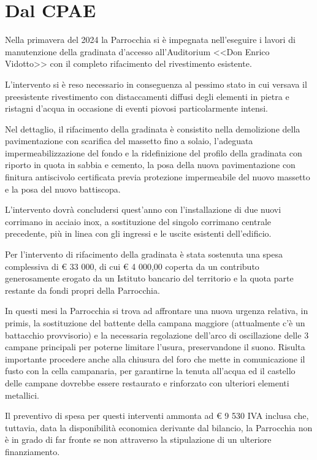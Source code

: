 \section{Dal CPAE}

Nella primavera del 2024 la Parrocchia si è impegnata nell'eseguire i lavori di manutenzione della gradinata d'accesso all'Auditorium <<Don Enrico Vidotto>> con il completo rifacimento del rivestimento esistente.

L'intervento si è reso necessario in conseguenza al pessimo stato in cui versava il preesistente rivestimento con distaccamenti diffusi degli elementi in pietra e ristagni d'acqua in occasione di eventi piovosi particolarmente intensi.

Nel dettaglio, il rifacimento della gradinata è consistito nella demolizione della pavimentazione con scarifica del massetto fino a solaio, l'adeguata impermeabilizzazione del fondo e la ridefinizione del profilo della gradinata con riporto in quota in sabbia e cemento, la posa della nuova pavimentazione con finitura antiscivolo certificata previa protezione impermeabile del nuovo massetto e la posa del nuovo battiscopa.

L'intervento dovrà concludersi quest'anno con l'installazione di due nuovi corrimano in acciaio inox, a sostituzione del singolo corrimano centrale precedente, più in linea con gli ingressi e le uscite esistenti dell'edificio.

Per l'intervento di rifacimento della gradinata è stata sostenuta una spesa complessiva di € 33 000, di cui € 4 000,00 coperta da un contributo generosamente erogato da un Istituto bancario del territorio e la quota parte restante da fondi propri della Parrocchia.

In questi mesi la Parrocchia si trova ad affrontare una nuova urgenza relativa, in primis, la sostituzione del battente della campana maggiore (attualmente c'è un battacchio provvisorio) e la necessaria regolazione dell'arco di oscillazione delle 3 campane principali per poterne limitare l'usura, preservandone il suono. Risulta importante procedere anche alla chiusura del foro che mette in comunicazione il fusto con la cella campanaria, per garantirne la tenuta all'acqua ed il castello delle campane dovrebbe essere restaurato e rinforzato con ulteriori elementi metallici.

Il preventivo di spesa per questi interventi ammonta ad € 9 530 IVA inclusa che, tuttavia, data la disponibilità economica derivante dal bilancio, la Parrocchia non è in grado di far fronte se non attraverso la stipulazione di un ulteriore finanziamento.

